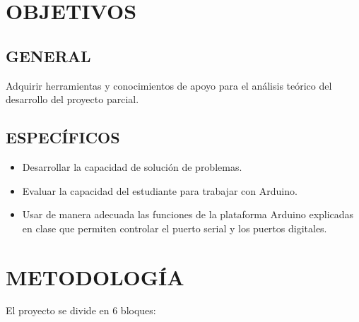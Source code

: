 \documentclass{article}
\begin{document}
\section{OBJETIVOS}

\subsection{GENERAL}

Adquirir herramientas y conocimientos de apoyo para el análisis teórico del desarrollo del proyecto parcial.

\subsection{ESPECÍFICOS}

\begin{itemize}

        \item Desarrollar la capacidad de solución de problemas.
        
        \item Evaluar la capacidad del estudiante para trabajar con Arduino.
        
        \item Usar de manera adecuada las funciones de la
plataforma Arduino explicadas en clase que permiten controlar el puerto serial y los puertos digitales.
\end{itemize}

\section{METODOLOGÍA}

El proyecto se divide en 6 bloques:
\end{document}
